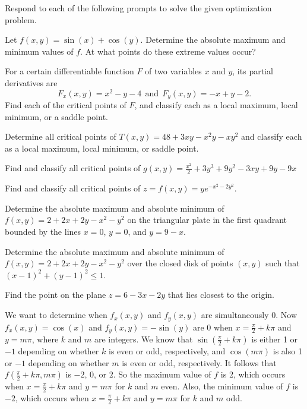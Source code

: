 \begin{exercises} 

\item Respond to each of the following prompts to solve the given optimization problem.
\ba
  \item Let  $f(x,y) = \sin(x)+\cos(y)$. Determine the absolute maximum and minimum values of $f$. At what points do these extreme values occur?

  \item For a certain differentiable function $F$ of two variables $x$ and $y$, its partial derivatives are 
$$F_x(x,y) = x^2-y-4 \ \ \mbox{and} \ \ F_y(x,y) = -x + y - 2.$$  Find each of the critical points of $F$, and classify each as a local maximum, local minimum, or a saddle point. 

  \item Determine all critical points of $T(x,y) = 48 + 3xy - x^2y - xy^2$ and classify each as a local maximum, local minimum, or saddle point.
  
  \item Find and classify all critical points of  $g(x,y) = \frac{x^2}{2} + 3y^3 + 9y^2 - 3xy + 9y - 9x$

  \item Find and classify all critical points of $z = f(x,y) = ye^{-x^2-2y^2}$.
  
  \item Determine the absolute maximum and absolute minimum of $f(x,y) = 2 + 2x + 2y - x^2 - y^2$ on the triangular plate in the first quadrant bounded by the lines $x = 0$, $y = 0$, and $y = 9-x$.

  \item Determine the absolute maximum and absolute minimum of $f(x,y) = 2 + 2x + 2y - x^2 - y^2$ over the closed disk of points $(x,y)$ such that $(x-1)^2 + (y-1)^2 \le 1$.
  
  \item Find the point on the plane $z = 6 - 3x - 2y$ that lies closest to the origin.

\ea

\begin{exerciseSolution}
\ba
  \item We want to determine when $f_x(x,y)$ and $f_y(x,y)$ are simultaneously 0. Now $f_x(x,y) = \cos(x)$ and $f_y(x,y) = -\sin(y)$ are 0 when $x = \frac{\pi}{2} + k \pi$ and $y = m \pi$, where $k$ and $m$ are integers. We know that $\sin\left(\frac{\pi}{2} + k \pi\right)$ is either 1 or $-1$ depending on whether $k$ is even or odd, respectively, and $\cos(m \pi)$ is also 1 or $-1$ depending on whether $m$ is even or odd, respectively. It follows that $f\left(\frac{\pi}{2} + k \pi, m \pi\right)$ is $-2$, $0$, or $2$. So the maximum value of $f$ is 2, which occurs when $x = \frac{\pi}{2} + k \pi$ and $y = m \pi$ for $k$ and $m$ even. Also, the minimum value of $f$ is $-2$, which occurs when $x = \frac{\pi}{2} + k \pi$ and $y = m \pi$ for $k$ and $m$ odd. 


\end{exerciseSolution}
\end{exercises}
